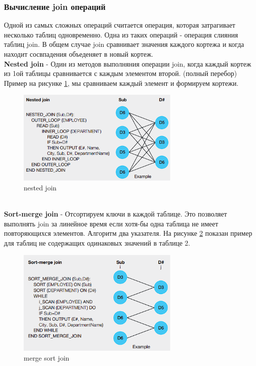 \documentclass{article}
\begin{document}
\subsubsection{Вычисление join операций}
Одной из самых сложных операций считается операция, которая затрагивает несколько таблиц одновременно. Одна из таких операций - операция слияния таблиц join.
В общем случае join сравнивает значения каждого кортежа и когда находит сосвпадения объеденяет в новый кортеж.\\
\textbf{Nested join} - Один из методов выполняния операции join, когда каждый кортеж из 1ой таблицы сравнивается с каждым элементом второй. (полный перебор) Пример на рисунке \ref{img7}, мы сравниваем каждый элемент и формируем кортежи.
\begin{figure}
    \centering
    \includegraphics[width=0.7\textwidth]{images/nested_join.png}
    \caption{nested join}
    \label{img7}
\end{figure}\\
\textbf{Sort-merge join} - Отсортируем ключи в каждой таблице. Это позволяет выполнять join за линейное время если хотя-бы одна таблица не имеет повторяющихся элементов.
Алгоритм два указателя. На рисунке \ref{img8} показан пример для таблиц не содержащих одинаковых значений в таблице 2.
\begin{figure}
    \centering
    \includegraphics[width=0.7\textwidth]{images/merge_sort.png}
    \caption{merge sort join}
    \label{img8}
\end{figure}\\
\end{document}
